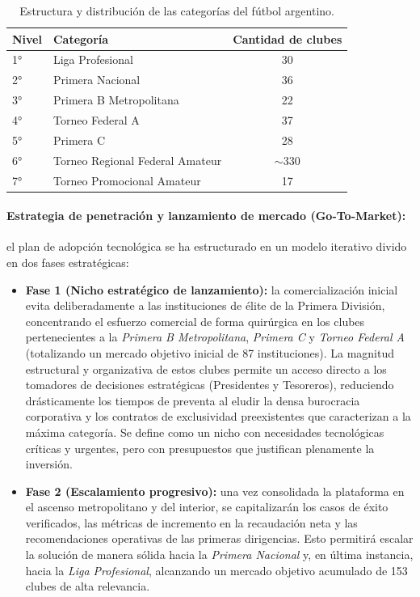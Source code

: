 \begin{table}[h!]
\centering
\renewcommand{\arraystretch}{1.3}
\begin{tabular}{|l|l|c|}
\hline
\rowcolor{gray!20} \textbf{Nivel} & \textbf{Categoría} & \textbf{Cantidad de clubes} \\ \hline
1° & Liga Profesional & 30 \\ \hline
2° & Primera Nacional & 36 \\ \hline
3° & Primera B Metropolitana & 22 \\ \hline
4° & Torneo Federal A & 37 \\ \hline
5° & Primera C & 28 \\ \hline
6° & Torneo Regional Federal Amateur & $\sim$330 \\ \hline
7° & Torneo Promocional Amateur & 17 \\ \hline

\end{tabular}
\caption{Estructura y distribución de las categorías del fútbol argentino.}
\label{tab:categorias_futbol}
\end{table}

\paragraph{Estrategia de penetración y lanzamiento de mercado (Go-To-Market):}

el plan de adopción tecnológica se ha estructurado en un modelo iterativo divido en dos fases estratégicas:

\begin{itemize}
    \item \textbf{Fase 1 (Nicho estratégico de lanzamiento):} la comercialización inicial evita deliberadamente a las instituciones de élite de la Primera División, concentrando el esfuerzo comercial de forma quirúrgica en los clubes pertenecientes a la \textit{Primera B Metropolitana}, \textit{Primera C} y \textit{Torneo Federal A} (totalizando un mercado objetivo inicial de 87 instituciones). La magnitud estructural y organizativa de estos clubes permite un acceso directo a los tomadores de decisiones estratégicas (Presidentes y Tesoreros), reduciendo drásticamente los tiempos de preventa al eludir la densa burocracia corporativa y los contratos de exclusividad preexistentes que caracterizan a la máxima categoría. Se define como un nicho con necesidades tecnológicas críticas y urgentes, pero con presupuestos que justifican plenamente la inversión.
    \item \textbf{Fase 2 (Escalamiento progresivo):} una vez consolidada la plataforma en el ascenso metropolitano y del interior, se capitalizarán los casos de éxito verificados, las métricas de incremento en la recaudación neta y las recomendaciones operativas de las primeras dirigencias. Esto permitirá escalar la solución de manera sólida hacia la \textit{Primera Nacional} y, en última instancia, hacia la \textit{Liga Profesional}, alcanzando un mercado objetivo acumulado de 153 clubes de alta relevancia.
\end{itemize}

